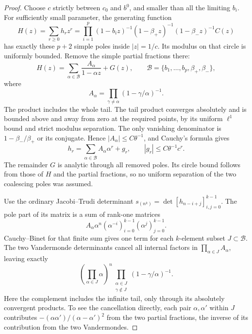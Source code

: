 \begin{proof}
Choose $c$ strictly between $c_0$ and $b^0$, and smaller than
all the limiting $b_i$. For sufficiently small parameter, the generating
function
\[
 H(z)=\sum_{r\ge0}h_rz^r
       =\prod_{i=1}^p(1-b_i z)^{-1}
           (1-\beta_+z)^{-1}(1-\beta_-z)^{-1} C(z)
\]
has exactly these $p+2$ simple poles inside $|z|=1/c$.
Its modulus on that circle is uniformly bounded. Remove the simple
partial fractions there:
\[
 H(z)=\sum_{\alpha\in\mathcal B}
          \frac{A_\alpha}{1-\alpha z}+G(z),\qquad
 \mathcal B=\{b_1,\ldots,b_p,\beta_+,\beta_-\},
\]
where
\[
 A_\alpha=\prod_{\gamma\ne\alpha}(1-\gamma/\alpha)^{-1}.
\]
The product includes the whole tail. The tail product converges
absolutely and is bounded above and away from zero at the required
points, by its uniform $\ell^1$ bound and strict modulus separation.
The only vanishing denominator is
$1-\beta_-/\beta_+$ or its conjugate. Hence
$|A_\alpha|\le C\theta^{-1}$, and Cauchy's formula gives
\begin{equation}\label{eq:analytic-h-poles-remainder}
 h_r=\sum_{\alpha\in\mathcal B}A_\alpha\alpha^r+g_r,
                         \qquad |g_r|\le C\theta^{-1}c^r.
\end{equation}
The remainder $G$ is analytic through all removed poles. Its circle
bound follows from those of $H$ and the partial fractions, so no
uniform separation of the two coalescing poles was assumed.

Use the ordinary Jacobi--Trudi determinant
$s_{(n^k)}=\det[h_{n-i+j}]_{i,j=0}^{k-1}$.
The pole part of its matrix is a sum of rank-one matrices
\[
        A_\alpha\alpha^n
              (\alpha^{-i})_{i=0}^{k-1}
              (\alpha^{j})_{j=0}^{k-1}.
\]
Cauchy--Binet for that finite sum gives one term for each
$k$-element subset $J\subset\mathcal B$. The two Vandermonde
determinants cancel all internal factors in
$\prod_{\alpha\in J}A_\alpha$, leaving exactly
\begin{equation}\label{eq:analytic-rectangular-subset-coefficient}
 \left(\prod_{\alpha\in J}\alpha\right)^n
       \prod_{\substack{\alpha\in J\\\gamma\notin J}}
                                      (1-\gamma/\alpha)^{-1}.
\end{equation}
Here the complement includes the infinite tail, only through its
absolutely convergent products. To see the cancellation directly,
each pair $\alpha,\alpha'$ within $J$ contributes
$-(\alpha\alpha')/(\alpha-\alpha')^2$ from the two partial
fractions, the inverse of its contribution from the two Vandermondes.


\end{proof}
